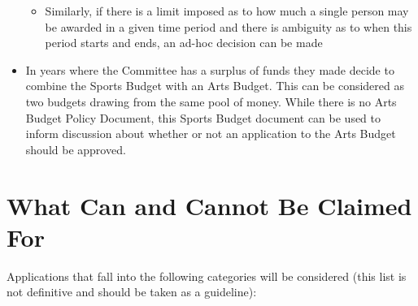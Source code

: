 \begin{itemize}
\begin{itemize}
		\item Similarly, if there is a limit imposed as to how much a single person may be awarded in a given time period and there is ambiguity as to when this period starts and ends, an ad-hoc decision can be made
	\end{itemize}
	\item In years where the Committee has a surplus of funds they made decide to combine the Sports Budget with an Arts Budget. This can be considered as two budgets drawing from the same pool of money. While there is no Arts Budget Policy Document, this Sports Budget document can be used to inform discussion about whether or not an application to the Arts Budget should be approved.
\end{itemize}

\section{What Can and Cannot Be Claimed For}
Applications that fall into the following categories will be considered (this list is not definitive and should be taken as a guideline):
